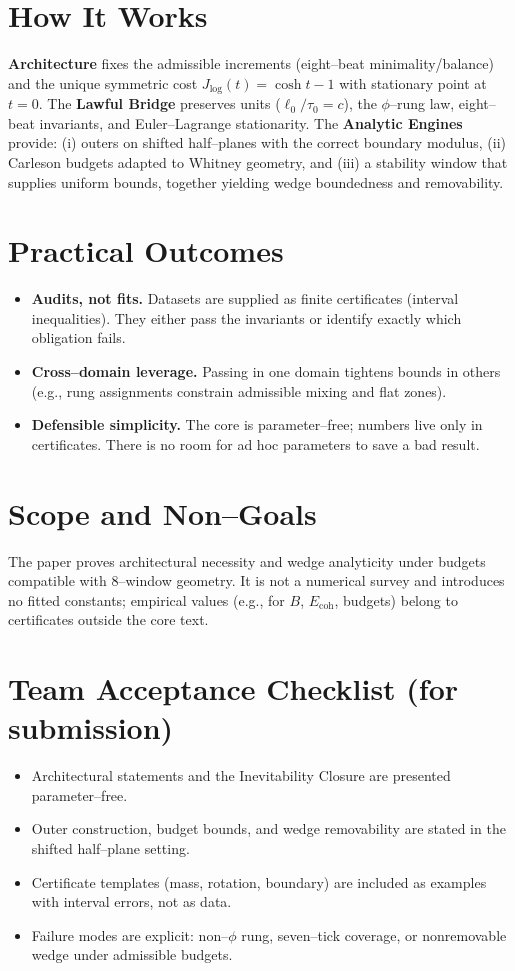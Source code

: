 \documentclass[11pt]{article}
\begin{document}
\section*{How It Works}
\textbf{Architecture} fixes the admissible increments (eight--beat minimality/balance) and the unique symmetric cost $J_{\log}(t)=\cosh t-1$ with stationary point at $t=0$. The \textbf{Lawful Bridge} preserves units ($\ell_0/\tau_0=c$), the $\phi$--rung law, eight--beat invariants, and Euler--Lagrange stationarity. The \textbf{Analytic Engines} provide: (i) outers on shifted half--planes with the correct boundary modulus, (ii) Carleson budgets adapted to Whitney geometry, and (iii) a stability window that supplies uniform bounds, together yielding wedge boundedness and removability.

\section*{Practical Outcomes}
\begin{itemize}
  \item \textbf{Audits, not fits.} Datasets are supplied as finite certificates (interval inequalities). They either pass the invariants or identify exactly which obligation fails.
  \item \textbf{Cross--domain leverage.} Passing in one domain tightens bounds in others (e.g., rung assignments constrain admissible mixing and flat zones).
  \item \textbf{Defensible simplicity.} The core is parameter--free; numbers live only in certificates. There is no room for ad hoc parameters to save a bad result.
\end{itemize}

\section*{Scope and Non--Goals}
The paper proves architectural necessity and wedge analyticity under budgets compatible with $8$--window geometry. It is not a numerical survey and introduces no fitted constants; empirical values (e.g., for $B$, $E_{\mathrm{coh}}$, budgets) belong to certificates outside the core text.

\section*{Team Acceptance Checklist (for submission)}
\begin{itemize}
  \item Architectural statements and the Inevitability Closure are presented parameter--free.
  \item Outer construction, budget bounds, and wedge removability are stated in the shifted half--plane setting.
  \item Certificate templates (mass, rotation, boundary) are included as examples with interval errors, not as data.
  \item Failure modes are explicit: non--$\phi$ rung, seven--tick coverage, or nonremovable wedge under admissible budgets.
\end{itemize}
\end{document}
